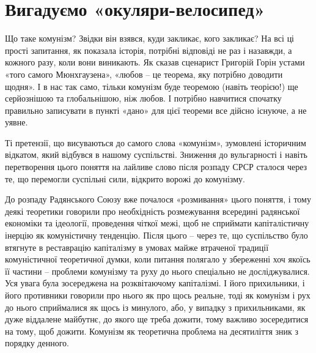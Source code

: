 \documentclass[12pt,a4paper,openany]{book}
\begin{document}
\ifSubfilesClassLoaded{\setcounter{page}{4}}{}
\section{Вигадуємо «окуляри-велосипед»}
\label{sec:01_izobretaem_ochki}

Що таке комунізм? Звідки він взявся, куди закликає, кого закликає? На всі ці прості запитання, як показала історія, потрібні відповіді не раз і назавжди, а кожного разу, коли вони виникають. Як сказав сценарист Григорій Горін устами «того самого Мюнхгаузена», «любов – це теорема, яку потрібно доводити щодня». І в нас так само, тільки комунізм буде теоремою (навіть теорією!) ще серйознішою та глобальнішою, ніж любов. І потрібно навчитися спочатку правильно записувати в пункті «дано» для цієї теореми все дійсно існуюче, а не уявне.

Ті претензії, що висуваються до самого слова «комунізм», зумовлені історичним відкатом, який відбувся в нашому суспільстві. Зниження до вульгарності і навіть перетворення цього поняття на лайливе слово після розпаду СРСР сталося через те, що перемогли суспільні сили, відкрито ворожі до комунізму.

До розпаду Радянського Союзу вже почалося «розмивання» цього поняття, і тому деякі теоретики говорили про необхідність розмежування всередині радянської економіки та ідеології, проведення чіткої межі, щоб не сприймати капіталістичну інерцію як комуністичну тенденцію. Після цього – через те, що суспільство було втягнуте в реставрацію капіталізму в умовах майже втраченої традиції комуністичної теоретичної думки, коли питання полягало у збереженні хоч якоїсь її частини – проблеми комунізму та руху до нього спеціально не досліджувалися. Уся увага була зосереджена на розквітаючому капіталізмі. І його прихильники, і його противники говорили про нього як про щось реальне, тоді як комунізм і рух до нього сприймалися як щось із минулого, або, у випадку з прихильниками, як дуже віддалене майбутнє, до якого ще треба дожити, тому важливо зосередитися на тому, щоб дожити. Комунізм як теоретична проблема на десятиліття зник з порядку денного.
\end{document}
